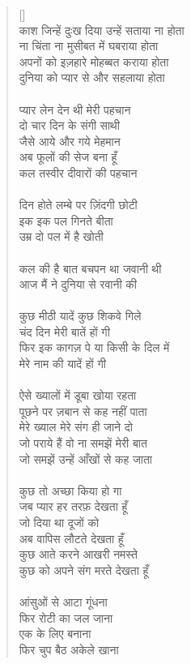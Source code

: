\begin{verse}[\versewidth]
{\\
काश जिन्हें दुःख दिया उन्हें सताया ना होता\\
ना चिंता ना मुसीबत में घबराया होता\\
अपनों को इज़हारे मोहब्बत कराया होता\\
दुनिया को प्यार से और सहलाया होता\\
\\
प्यार लेन देन थी मेरी पहचान\\
दो चार दिन के संगी साथी\\
जैसे आये और गये मेहमान\\
अब फूलों की सेज बना हूँ\\
कल तस्वीर दीवारों की पहचान\\
\\
दिन होते लम्बे पर ज़िंदगी छोटी\\
इक इक पल गिनते बीता\\
उम्र दो पल में है खोती\\
\\
कल की है बात बचपन था जवानी थी\\
आज मैं ने दुनिया से रवानी की\\
\\
कुछ मीठी यादें कुछ शिकवे गिले\\
चंद दिन मेरी बातें हों गी\\
फिर इक कागज़ पे या किसी के दिल में\\
मेरे नाम की यादें हों गी\\
\\
ऐसे ख्यालों में डूबा खोया रहता\\
पूछने पर ज़बान से कह नहीं पाता\\
मेरे ख्याल मेरे संग ही जाने दो\\
जो पराये हैं वो ना समझें मेरी बात\\
जो समझें उन्हें आँखों से कह जाता\\
\\
कुछ तो अच्छा किया हो गा\\
जब प्यार हर तरफ़ देखता हूँ\\
जो दिया था दूजों को\\
अब वापिस लौटते देखता हूँ\\
कुछ आते करने आखरी नमस्ते\\
कुछ को अपने संग मरते देखता हूँ\\
\\
आंसुओं से आटा गूंधना\\
फिर रोटी का जल जाना\\
एक के लिए बनाना\\
फिर चुप बैठ अकेले खाना\\
}
\end{verse}

